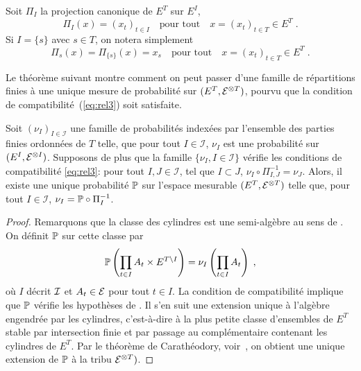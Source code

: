 Soit $\Pi_I$ la projection canonique de $E^T$ sur $E^I$,
\begin{equation}
\label{eq:projectioncanonique}
\Pi_I( x ) = (x_t)_{t \in I}\quad \text{pour tout}\quad x=(x_t)_{t \in T} \in E^T\;.
\end{equation}
Si $I=\{s\}$ avec $s\in T$, on notera simplement
\begin{equation}
\label{eq:projectioncanoniquesingle}
\Pi_s( x ) =\Pi_{\{s\}}( x )= x_s\quad \text{pour tout}\quad x=(x_t)_{t \in T} \in E^T\;.
\end{equation}

Le th\'eor\`eme suivant montre comment on peut passer d'une famille de
r\'epartitions finies \`a une unique mesure de probabilit\'e sur $(E^T,\mathcal{E}^{\otimes
  T})$, pourvu que la condition de compatibilit\'e~(\ref{eq:rel3}) soit
satisfaite.

\begin{theorem}
\label{th:kolmogorov}
Soit $(\nu_I)_{I \in \mathcal{I}}$ une famille de probabilit\'es
index\'ees par l'ensemble des parties finies ordonn\'ees de $T$ telle, que pour tout $I \in \mathcal{I}$,
$\nu_I$ est une probabilit\'e sur $(E^I, \mathcal{E}^{\otimes I})$. Supposons de plus
que la famille $\{ \nu_I, I \in \mathcal{I} \}$ v\'erifie les conditions
de compatibilit\'e \eqref{eq:rel3}: pour tout $I,J \in \mathcal{I}$, tel que
$I \subset J$, $\nu_I \circ \Pi_{I,J}^{-1} = \nu_J$. Alors, il existe
une unique probabilit\'e $\mathbb{P}$ sur l'espace mesurable $(E^T,\mathcal{E}^{\otimes T})$
telle que, pour tout $I \in \mathcal{I}$, $\nu_I = \mathbb{P} \circ \Pi_I^{-1}$.
\end{theorem}
\begin{proof}\smartqed
Remarquons que la classe des cylindres est une semi-alg\`ebre au sens de
\cite[p.~297]{royden:1988}. On d\'efinit $\mathbb{P}$ sur cette classe par
$$
\mathbb{P}\left(\prod_{t\in I}A_{t}\times E^{T\setminus I}\right)=\nu_I \left(\prod_{t\in I}A_{t}\right)\;,
$$
o\`u $I$ d\'ecrit $\mathcal{I}$ et $A_t\in\mathcal{E}$ pour tout $t \in I$. La condition
de compatibilit\'e implique que $\mathbb{P}$ v\'erifie les hypoth\`eses de
\cite[Proposition~9]{royden:1988}. Il s'en suit une extension unique \`a
l'alg\`ebre engendr\'ee par les cylindres, c'est-\`a-dire \`a la plus petite
classe d'ensembles de $E^T$ stable par intersection finie et par
passage au compl\'ementaire contenant les cylindres de $E^T$. Par le
th\'eor\`eme de Carath\'eodory, voir~\cite[Th\'eor\`eme~8]{royden:1988}, on
obtient une unique extension de $\mathbb{P}$ \`a la tribu $\mathcal{E}^{\otimes T})$.
\end{proof}

